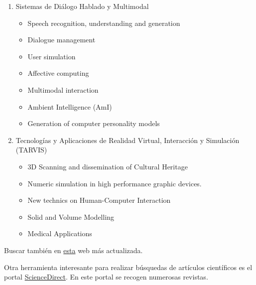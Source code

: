 {{\begin{enumerate}[itemsep=0mm]
\begin{itemize}[nosep]
            \item Métodos formales en sistemas concurrentes
            \item Computación de tiempo real y empotrada para sistemas ubicuos y de inteligencia ambiental
            \item Middlewares y marcos de desarrollo para sistemas empotrados de tiempo real distribuidos
            \item Sistemas de medición distribuido y de instrumentación 
        \end{itemize} 
        \item Sistemas de Diálogo Hablado y Multimodal
        \begin{itemize}[nosep]
            \item Speech recognition, understanding and generation
            \item Dialogue management
            \item User simulation
            \item Affective computing
            \item Multimodal interaction
            \item Ambient Intelligence (AmI)
            \item Generation of computer personality models
        \end{itemize}
        \item Tecnologías y Aplicaciones de Realidad Virtual, Interacción y Simulación (TARVIS)
        \begin{itemize}[nosep]
            \item 3D Scanning and dissemination of Cultural Heritage
            \item Numeric simulation in high performance graphic devices.
            \item New technics on Human-Computer Interaction
            \item Solid and Volume Modelling
            \item Medical Applications
        \end{itemize}
    \end{enumerate}
    }

    Buscar también en \href{https://www.aepia.org/grupos-de-investigacion/}{esta} web más actualizada.
}

Otra herramienta interesante para realizar búsquedas de artículos científicos es el portal \href{https://www.sciencedirect.com/}{ScienceDirect}. En este portal se recogen numerosas revistas.

